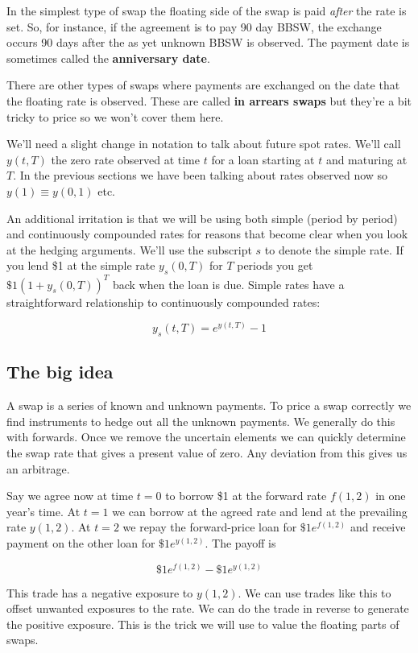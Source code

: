 \documentclass{tran-l}
\theoremstyle{definition}
\theoremstyle{remark}
\numberwithin{equation}{subsection}
\begin{document}
In the simplest type of swap the floating side of the swap is paid \textit{after} the rate is set. So, for instance, if the agreement is to pay 90 day BBSW, the exchange occurs 90 days after the as yet unknown BBSW is observed. The payment date is sometimes called the \textbf{anniversary date}. 

There are other types of swaps where payments are exchanged on the date that the floating rate is observed. These are called \textbf{in arrears swaps} but they're a bit tricky to price so we won't cover them here.

We'll need a slight change in notation to talk about future spot rates. We'll call $y(t,T)$ the zero rate observed at time $t$ for a loan starting at $t$ and maturing at $T$. In the previous sections we have been talking about rates observed now so $y(1) \equiv y(0,1)$ etc.

An additional irritation is that we will be using both simple (period by period) and continuously compounded rates for reasons that become clear when you look at the hedging arguments. We'll use the subscript $s$ to denote the simple rate. If you lend \$1 at the simple rate $y_s(0,T)$ for $T$ periods you get $\$1(1+y_s(0,T))^T$ back when the loan is due. Simple rates have a straightforward relationship to continuously compounded rates:

\[ y_s(t,T) = e^{y(t,T)}-1\]

\subsection{The big idea}

A swap is a series of known and unknown payments. To price a swap correctly we find instruments to hedge out all the unknown payments. We generally do this with forwards. Once we remove the uncertain elements we can quickly determine the swap rate that gives a present value of zero. Any deviation from this gives us an arbitrage.

Say we agree now at time $t=0$ to borrow \$1 at the forward rate $f(1,2)$ in one year's time. At $t=1$ we can borrow at the agreed rate and lend at the prevailing rate $y(1,2)$. At $t=2$ we repay the forward-price loan for $\$1e^{f(1,2)}$ and receive payment on the other loan for $\$1e^{y(1,2)}$. The payoff is

\[ \$1e^{f(1,2)} -\$1e^{y(1,2)} \]

This trade has a negative exposure to $y(1,2)$. We can use trades like this to offset unwanted exposures to the rate. We can do the trade in reverse to generate the positive exposure. This is the trick we will use to value the floating parts of swaps. 
\end{document}
